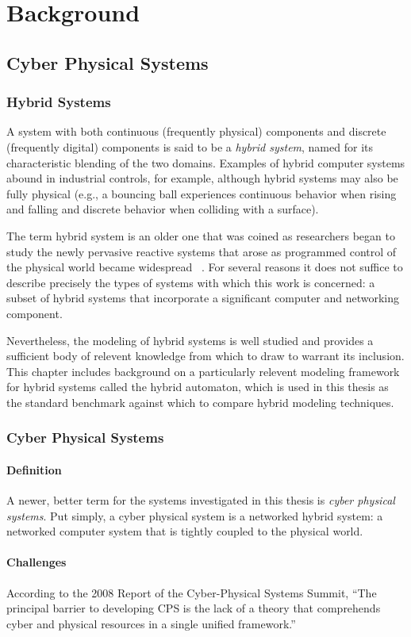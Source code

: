 \chapter{Background}
\section{Cyber Physical Systems}
\subsection{Hybrid Systems}
A system with both continuous (frequently physical) components and discrete (frequently digital)
components is said to be a \emph{hybrid system}, named for its characteristic blending of the
two domains. Examples of hybrid computer systems abound in industrial controls, for example,
although hybrid systems may also be fully physical (e.g., a bouncing ball experiences continuous
behavior when rising and falling and discrete behavior when colliding with a surface).

The term hybrid system is an older one that was coined as researchers began to study the newly
pervasive reactive systems that arose as programmed control of the physical world became 
widespread ~\cite{alur1993hybrid}. For several reasons it does not suffice to describe precisely
the types of systems with which this work is concerned: a subset of hybrid
systems that incorporate a significant computer and networking component.

Nevertheless, the modeling of hybrid systems is well studied and provides a sufficient body
of relevent knowledge from which to draw to warrant its inclusion. This chapter includes
background on a particularly relevent modeling framework for hybrid systems called the
hybrid automaton, which is used in this thesis as the standard benchmark against which to
compare hybrid modeling techniques.
\subsection{Cyber Physical Systems}
\subsubsection{Definition}
A newer, better term for the systems investigated in this thesis is \emph{cyber physical systems}.
Put simply, a cyber physical system is a networked hybrid system: a networked computer system that is 
tightly coupled to the physical world. 
\subsubsection{Challenges}
According to the 2008 Report of the Cyber-Physical Systems Summit, ``The principal barrier to 
developing CPS is the lack of a theory that comprehends cyber and physical resources in a 
single unified framework.''~\cite{summitreport2008}

